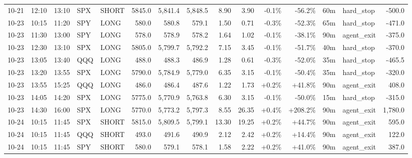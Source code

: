\documentclass[11pt,a4paper,twoside]{article}
\begin{document}
\begin{landscape}
\begin{center}
\begin{longtable}{>{\color{txtmain}}l l l l l r r r r r r r r >{\color{txtmain}}l r}
10-21 & 12:10 & 13:10 & SPX & SHORT & 5845.0 & 5,841.4 & 5,848.5 & 8.90 & 3.90 & \textcolor{lossred}{-0.1\%} & \textcolor{lossred}{-56.2\%} & 60m & hard\_stop & \textcolor{lossred}{-500.0} \\
10-23 & 10:15 & 11:20 & SPY & LONG & 580.0 & 580.8 & 579.1 & 1.50 & 0.71 & \textcolor{lossred}{-0.3\%} & \textcolor{lossred}{-52.3\%} & 65m & hard\_stop & \textcolor{lossred}{-471.0} \\
10-23 & 11:30 & 13:00 & SPY & LONG & 578.0 & 578.9 & 578.2 & 1.64 & 1.02 & \textcolor{lossred}{-0.1\%} & \textcolor{lossred}{-38.1\%} & 90m & agent\_exit & \textcolor{lossred}{-375.0} \\
10-23 & 12:30 & 13:10 & SPX & LONG & 5805.0 & 5,799.7 & 5,792.2 & 7.15 & 3.45 & \textcolor{lossred}{-0.1\%} & \textcolor{lossred}{-51.7\%} & 40m & hard\_stop & \textcolor{lossred}{-370.0} \\
10-23 & 13:05 & 13:40 & QQQ & LONG & 488.0 & 488.3 & 486.9 & 1.28 & 0.61 & \textcolor{lossred}{-0.3\%} & \textcolor{lossred}{-52.0\%} & 35m & hard\_stop & \textcolor{lossred}{-465.5} \\
10-23 & 13:20 & 13:55 & SPX & LONG & 5790.0 & 5,784.9 & 5,779.0 & 6.35 & 3.15 & \textcolor{lossred}{-0.1\%} & \textcolor{lossred}{-50.4\%} & 35m & hard\_stop & \textcolor{lossred}{-320.0} \\
10-23 & 13:55 & 15:25 & QQQ & LONG & 486.0 & 486.4 & 487.6 & 1.22 & 1.73 & \textcolor{wingreen}{+0.2\%} & \textcolor{wingreen}{+41.8\%} & 90m & agent\_exit & \textcolor{wingreen}{408.0} \\
10-23 & 14:05 & 14:20 & SPX & LONG & 5775.0 & 5,770.9 & 5,763.8 & 6.30 & 3.15 & \textcolor{lossred}{-0.1\%} & \textcolor{lossred}{-50.0\%} & 15m & hard\_stop & \textcolor{lossred}{-315.0} \\
10-23 & 14:30 & 16:00 & SPX & LONG & 5770.0 & 5,773.2 & 5,797.3 & 8.55 & 26.35 & \textcolor{wingreen}{+0.4\%} & \textcolor{wingreen}{+208.2\%} & 90m & agent\_exit & \textcolor{wingreen}{1,780.0} \\
10-24 & 10:15 & 11:45 & SPX & SHORT & 5815.0 & 5,809.5 & 5,799.1 & 13.30 & 19.25 & \textcolor{wingreen}{+0.2\%} & \textcolor{wingreen}{+44.7\%} & 90m & agent\_exit & \textcolor{wingreen}{595.0} \\
10-24 & 10:15 & 11:45 & QQQ & SHORT & 493.0 & 491.6 & 490.9 & 2.12 & 2.42 & \textcolor{wingreen}{+0.2\%} & \textcolor{wingreen}{+14.4\%} & 90m & agent\_exit & \textcolor{wingreen}{122.0} \\
10-24 & 10:15 & 11:45 & SPY & SHORT & 580.0 & 579.1 & 578.1 & 1.58 & 2.22 & \textcolor{wingreen}{+0.2\%} & \textcolor{wingreen}{+41.0\%} & 90m & agent\_exit & \textcolor{wingreen}{387.0} \\

\end{longtable}
\end{center}
\end{landscape}
\end{document}
